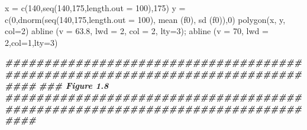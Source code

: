 \documentclass[
]{book}
\newenvironment{Shaded}{\begin{snugshade}}{\end{snugshade}}
\newcommand{\AttributeTok}[1]{\textcolor[rgb]{0.77,0.63,0.00}{#1}}
\newcommand{\DecValTok}[1]{\textcolor[rgb]{0.00,0.00,0.81}{#1}}
\newcommand{\DocumentationTok}[1]{\textcolor[rgb]{0.56,0.35,0.01}{\textbf{\textit{#1}}}}
\newcommand{\FloatTok}[1]{\textcolor[rgb]{0.00,0.00,0.81}{#1}}
\newcommand{\FunctionTok}[1]{\textcolor[rgb]{0.00,0.00,0.00}{#1}}
\newcommand{\NormalTok}[1]{#1}
\newcommand{\OtherTok}[1]{\textcolor[rgb]{0.56,0.35,0.01}{#1}}
\newcommand{\StringTok}[1]{\textcolor[rgb]{0.31,0.60,0.02}{#1}}
\begin{document}
\begin{Shaded}
\begin{Highlighting}[]
\NormalTok{x }\OtherTok{=} \FunctionTok{c}\NormalTok{(}\DecValTok{140}\NormalTok{,}\FunctionTok{seq}\NormalTok{(}\DecValTok{140}\NormalTok{,}\DecValTok{175}\NormalTok{,}\AttributeTok{length.out =} \DecValTok{100}\NormalTok{),}\DecValTok{175}\NormalTok{)}
\NormalTok{y }\OtherTok{=} \FunctionTok{c}\NormalTok{(}\DecValTok{0}\NormalTok{,}\FunctionTok{dnorm}\NormalTok{(}\FunctionTok{seq}\NormalTok{(}\DecValTok{140}\NormalTok{,}\DecValTok{175}\NormalTok{,}\AttributeTok{length.out =} \DecValTok{100}\NormalTok{), }\FunctionTok{mean}\NormalTok{ (f0), }\FunctionTok{sd}\NormalTok{ (f0)),}\DecValTok{0}\NormalTok{)}
\FunctionTok{polygon}\NormalTok{(x, y, }\AttributeTok{col=}\StringTok{\textquotesingle{}2\textquotesingle{}}\NormalTok{)}
\FunctionTok{abline}\NormalTok{ (}\AttributeTok{v =} \FloatTok{63.8}\NormalTok{, }\AttributeTok{lwd =} \DecValTok{2}\NormalTok{, }\AttributeTok{col =} \DecValTok{2}\NormalTok{, }\AttributeTok{lty=}\DecValTok{3}\NormalTok{); }\FunctionTok{abline}\NormalTok{ (}\AttributeTok{v =} \DecValTok{70}\NormalTok{, }\AttributeTok{lwd =} \DecValTok{2}\NormalTok{,}\AttributeTok{col=}\DecValTok{1}\NormalTok{,}\AttributeTok{lty=}\DecValTok{3}\NormalTok{)}

\DocumentationTok{\#\#\#\#\#\#\#\#\#\#\#\#\#\#\#\#\#\#\#\#\#\#\#\#\#\#\#\#\#\#\#\#\#\#\#\#\#\#\#\#\#\#\#\#\#\#\#\#\#\#\#\#\#\#\#\#\#\#\#\#\#\#\#\#\#\#\#\#\#\#\#\#\#\#\#\#\#\#\#\#}
\DocumentationTok{\#\#\# Figure 1.8}
\DocumentationTok{\#\#\#\#\#\#\#\#\#\#\#\#\#\#\#\#\#\#\#\#\#\#\#\#\#\#\#\#\#\#\#\#\#\#\#\#\#\#\#\#\#\#\#\#\#\#\#\#\#\#\#\#\#\#\#\#\#\#\#\#\#\#\#\#\#\#\#\#\#\#\#\#\#\#\#\#\#\#\#\#}


\end{Highlighting}
\end{Shaded}
\end{document}
